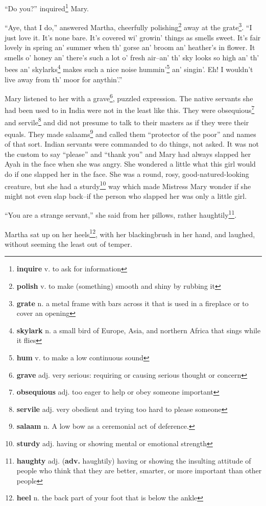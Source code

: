 ``Do you?'' inquired\footnote{\textbf{inquire} v. to ask for information} Mary.

``Aye, that I do,'' answered Martha, cheerfully polishing\footnote{\textbf{polish} v. to make (something) smooth and shiny by rubbing it} away at the grate\footnote{\textbf{grate} n. a metal frame with bars across it that is used in a fireplace or to cover an opening}. ``I just love it. It's none bare. It's covered wi' growin' things as smells sweet. It's fair lovely in spring an' summer when th' gorse an' broom an' heather's in flower. It smells o' honey an' there's such a lot o' fresh air--an' th' sky looks so high an' th' bees an' skylarks\footnote{\textbf{skylark} n. a small bird of Europe, Asia, and northern Africa that sings while it flies} makes such a nice noise hummin'\footnote{\textbf{hum} v. to make a low continuous sound} an' singin'. Eh! I wouldn't live away from th' moor for anythin'.''

Mary listened to her with a grave\footnote{\textbf{grave} adj. very serious: requiring or causing serious thought or concern}, puzzled expression. The native servants she had been used to in India were not in the least like this. They were obsequious\footnote{\textbf{obsequious} adj. too eager to help or obey someone important} and servile\footnote{\textbf{servile} adj. very obedient and trying too hard to please someone} and did not presume to talk to their masters as if they were their equals. They made salaams\footnote{\textbf{salaam} n. A low bow as a ceremonial act of deference.} and called them ``protector of the poor'' and names of that sort. Indian servants were commanded to do things, not asked. It was not the custom to say ``please'' and ``thank you'' and Mary had always slapped her Ayah in the face when she was angry. She wondered a little what this girl would do if one slapped her in the face. She was a round, rosy, good-natured-looking creature, but she had a sturdy\footnote{\textbf{sturdy} adj. having or showing mental or emotional strength} way which made Mistress Mary wonder if she might not even slap back--if the person who slapped her was only a little girl.

``You are a strange servant,'' she said from her pillows, rather haughtily\footnote{\textbf{haughty} adj. (\textbf{adv.} haughtily) having or showing the insulting attitude of people who think that they are better, smarter, or more important than other people}.

Martha sat up on her heels\footnote{\textbf{heel} n. the back part of your foot that is below the ankle}, with her blackingbrush in her hand, and laughed, without seeming the least out of temper.
